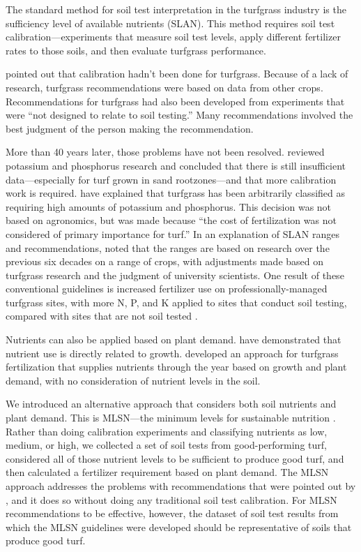 \documentclass[12pt, a4paper, titlepage]{article}
\begin{document}
The standard method for soil test interpretation in the turfgrass industry is the sufficiency level of available nutrients (SLAN). This method requires soil test calibration---experiments that measure soil test levels, apply different fertilizer rates to those soils, and then evaluate turfgrass performance.

\textcite{turner1978} pointed out that calibration hadn't been done for turfgrass. Because of a lack of research, turfgrass recommendations were based on data from other crops. Recommendations for turfgrass had also been developed from experiments that were ``not designed to relate to soil testing.'' Many recommendations involved the best judgment of the person making the recommendation.

More than 40 years later, those problems have not been resolved. \textcite{Frank2013} reviewed potassium and phosphorus research and concluded that there is still insufficient data---especially for turf grown in sand rootzones---and that more calibration work is required. \textcite[p.~164]{carrow-fertility-book} have explained that turfgrass has been arbitrarily classified as requiring high amounts of potassium and phosphorus. This decision was not based on agronomics, but was made because ``the cost of fertilization was not considered of primary importance for turf.'' In an explanation of SLAN ranges and recommendations, \textcite{clarifying-3} noted that the ranges are based on research over the previous six decades on a range of crops, with adjustments made based on turfgrass research and the judgment of university scientists. One result of these conventional guidelines is increased fertilizer use on professionally-managed turfgrass sites, with more N, P, and K applied to sites that conduct soil testing, compared with sites that are not soil tested \citep{gelernter2016}.

Nutrients can also be applied based on plant demand. \textcite{kussow-n-demand} have demonstrated that nutrient use is directly related to growth. \textcite{ericsson2012a, ericsson2012b} developed an approach for turfgrass fertilization that supplies nutrients through the year based on growth and plant demand, with no consideration of nutrient levels in the soil.

We introduced an alternative approach that considers both soil nutrients and plant demand. This is MLSN---the minimum levels for sustainable nutrition \citep{stowell2012, stowell2014, woods-peerj-2016}. Rather than doing calibration experiments and classifying nutrients as low, medium, or high, we collected a set of soil tests from good-performing turf, considered all of those nutrient levels to be sufficient to produce good turf, and then calculated a fertilizer requirement based on plant demand. The MLSN approach addresses the problems with recommendations that were pointed out by \textcite{turner1978}, and it does so without doing any traditional soil test calibration. For MLSN recommendations to be effective, however, the dataset of soil test results from which the MLSN guidelines were developed should be representative of soils that produce good turf.
\end{document}
